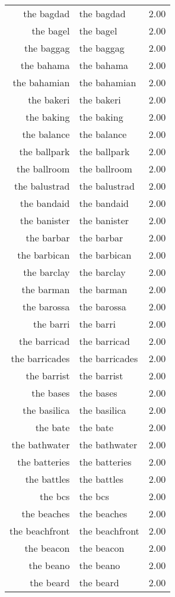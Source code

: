 \begin{table}[ht]
\begin{tabular}{rlr}
  the bagdad & the bagdad & 2.00 \\ 
  the bagel & the bagel & 2.00 \\ 
  the baggag & the baggag & 2.00 \\ 
  the bahama & the bahama & 2.00 \\ 
  the bahamian & the bahamian & 2.00 \\ 
  the bakeri & the bakeri & 2.00 \\ 
  the baking & the baking & 2.00 \\ 
  the balance & the balance & 2.00 \\ 
  the ballpark & the ballpark & 2.00 \\ 
  the ballroom & the ballroom & 2.00 \\ 
  the balustrad & the balustrad & 2.00 \\ 
  the bandaid & the bandaid & 2.00 \\ 
  the banister & the banister & 2.00 \\ 
  the barbar & the barbar & 2.00 \\ 
  the barbican & the barbican & 2.00 \\ 
  the barclay & the barclay & 2.00 \\ 
  the barman & the barman & 2.00 \\ 
  the barossa & the barossa & 2.00 \\ 
  the barri & the barri & 2.00 \\ 
  the barricad & the barricad & 2.00 \\ 
  the barricades & the barricades & 2.00 \\ 
  the barrist & the barrist & 2.00 \\ 
  the bases & the bases & 2.00 \\ 
  the basilica & the basilica & 2.00 \\ 
  the bate & the bate & 2.00 \\ 
  the bathwater & the bathwater & 2.00 \\ 
  the batteries & the batteries & 2.00 \\ 
  the battles & the battles & 2.00 \\ 
  the bcs & the bcs & 2.00 \\ 
  the beaches & the beaches & 2.00 \\ 
  the beachfront & the beachfront & 2.00 \\ 
  the beacon & the beacon & 2.00 \\ 
  the beano & the beano & 2.00 \\ 
  the beard & the beard & 2.00 \\ 

\end{tabular}
\end{table}
